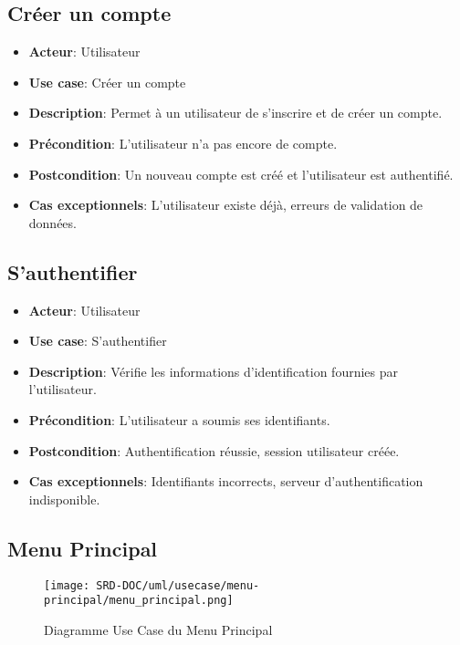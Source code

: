 \documentclass{article}
\begin{document}
\subsection*{Créer un compte}
\begin{itemize}
    \item \textbf{Acteur}: Utilisateur
    \item \textbf{Use case}: Créer un compte
    \item \textbf{Description}: Permet à un utilisateur de s’inscrire et de créer un compte.
    \item \textbf{Précondition}: L’utilisateur n’a pas encore de compte.
    \item \textbf{Postcondition}: Un nouveau compte est créé et l'utilisateur est authentifié.
    \item \textbf{Cas exceptionnels}: L'utilisateur existe déjà, erreurs de validation de données.
\end{itemize}

\subsection*{S'authentifier}
\begin{itemize}
    \item \textbf{Acteur}: Utilisateur
    \item \textbf{Use case}: S'authentifier
    \item \textbf{Description}: Vérifie les informations d'identification fournies par l'utilisateur.
    \item \textbf{Précondition}: L'utilisateur a soumis ses identifiants.
    \item \textbf{Postcondition}: Authentification réussie, session utilisateur créée.
    \item \textbf{Cas exceptionnels}: Identifiants incorrects, serveur d’authentification indisponible.
\end{itemize}
\newpage

\subsection{Menu Principal}

\begin{figure}[H]
    \centering
    \texttt{[image: SRD-DOC/uml/usecase/menu-principal/menu\_principal.png]}
    \caption{Diagramme Use Case du Menu Principal}
    \label{fig:main-menu}
\end{figure}
\end{document}
